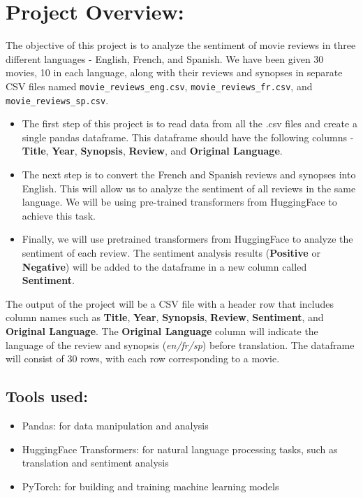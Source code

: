 
\section{Project Overview:}

The objective of this project is to analyze the sentiment of movie reviews in three different languages - English, French, and Spanish. We have been given 30 movies, 10 in each language, along with their reviews and synopses in separate CSV files named \verb|movie_reviews_eng.csv|, \verb|movie_reviews_fr.csv|, and \verb|movie_reviews_sp.csv|.

\begin{itemize}
    \item The first step of this project is to read data from all the .csv files and create a single pandas dataframe. This dataframe should have the following columns - \textbf{Title}, \textbf{Year}, \textbf{Synopsis}, \textbf{Review}, and \textbf{Original Language}.
    \item The next step is to convert the French and Spanish reviews and synopses into English. This will allow us to analyze the sentiment of all reviews in the same language. We will be using pre-trained transformers from HuggingFace to achieve this task.
    \item Finally, we will use pretrained transformers from HuggingFace to analyze the sentiment of each review. The sentiment analysis results (\textbf{Positive} or \textbf{Negative}) will be added to the dataframe in a new column called \textbf{Sentiment}.
\end{itemize}
The output of the project will be a CSV file with a header row that includes column names such as \textbf{Title}, \textbf{Year}, \textbf{Synopsis}, \textbf{Review}, \textbf{Sentiment}, and \textbf{Original Language}. The \textbf{Original Language} column will indicate the language of the review and synopsis (\textit{en/fr/sp}) before translation. The dataframe will consist of 30 rows, with each row corresponding to a movie.

\subsection{Tools used:}

\begin{itemize}
    \item Pandas: for data manipulation and analysis
    \item HuggingFace Transformers: for natural language processing tasks, such as translation and sentiment analysis
    \item PyTorch: for building and training machine learning models
\end{itemize}


